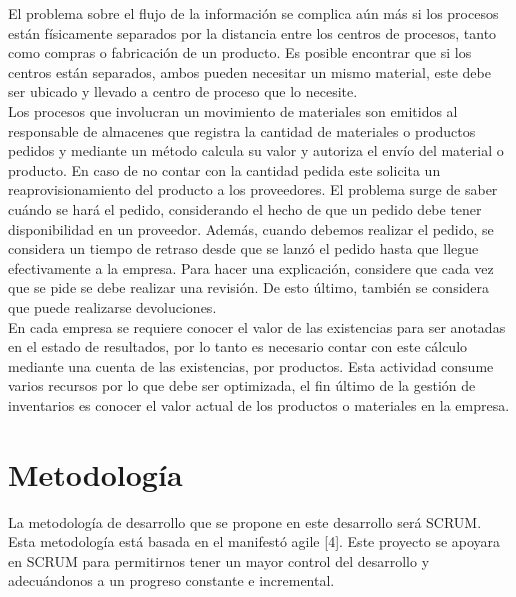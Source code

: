 El problema sobre el flujo de la información se complica aún más si los procesos están físicamente separados por la distancia entre los centros de procesos, tanto como compras o fabricación de un producto. Es posible encontrar que si los centros están separados, ambos pueden necesitar un mismo material, este debe ser ubicado y llevado a centro de proceso que lo necesite.\\

Los procesos que involucran un movimiento de materiales son emitidos al responsable de almacenes que registra la cantidad de materiales o productos pedidos y mediante un método calcula su valor y autoriza el  envío del material o producto. En caso de no contar con la cantidad pedida este solicita un reaprovisionamiento del producto a los proveedores. El problema surge de saber cuándo se hará el pedido, considerando el hecho de que un pedido debe tener disponibilidad en un proveedor. Además, cuando debemos realizar el pedido, se considera un tiempo de retraso desde que se lanzó el pedido hasta que llegue efectivamente a la empresa. Para hacer una explicación, considere que cada vez que se pide se debe realizar una revisión. De esto último, también se considera que puede realizarse devoluciones.\\

En cada empresa se requiere conocer el valor de las existencias para ser anotadas en el estado de resultados, por lo tanto es necesario contar con este cálculo mediante una cuenta de las existencias, por productos. Esta actividad consume varios recursos por lo que debe ser optimizada, el fin último de la gestión de inventarios es conocer el valor actual de los productos o materiales en la empresa.\\

\section{Metodología}

La metodología de desarrollo que se propone en este desarrollo será SCRUM. Esta metodología está basada en el manifestó agile [4]. Este proyecto se apoyara en SCRUM para permitirnos tener un mayor control del desarrollo y adecuándonos a un progreso constante e incremental.\\

